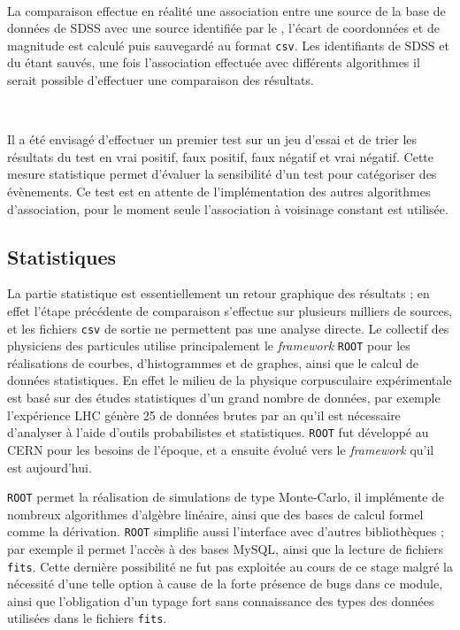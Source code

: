 \

La comparaison effectue en réalité une association entre une source de la base de données de SDSS avec une source identifiée par le \stack{}, l'écart de coordonnées et de magnitude est calculé puis sauvegardé au format \texttt{csv}. Les identifiants de SDSS et du \stack{} étant sauvés, une fois l'association effectuée avec différents algorithmes il serait possible d'effectuer une comparaison des résultats.

\

Il a été envisagé d'effectuer un premier test sur un jeu d'essai et de trier les résultats du test en vrai positif, faux positif, faux négatif et vrai négatif. Cette mesure statistique permet d'évaluer la sensibilité d'un test pour catégoriser des évènements. Ce test est en attente de l'implémentation des autres algorithmes d'association, pour le moment seule l'association à voisinage constant est utilisée.


	\subsection{Statistiques}

La partie statistique est essentiellement un retour graphique des résultats ; en effet l'étape précédente de comparaison s'effectue sur plusieurs milliers de sources, et les fichiers \texttt{csv} de sortie ne permettent pas une analyse directe. Le collectif des physiciens des particules utilise principalement le \emph{framework} \texttt{ROOT} pour les réalisations de courbes, d'histogrammes et de graphes, ainsi que le calcul de données statistiques. En effet le milieu de la physique corpusculaire expérimentale est basé sur des études statistiques d'un grand nombre de données, par exemple l'expérience LHC génère 25 \Po{} de données brutes par an qu'il est nécessaire d'analyser à l'aide d'outils probabilistes et statistiques. \texttt{ROOT} fut développé au CERN pour les besoins de l'époque, et a ensuite évolué vers le \emph{framework} \Cpp{} qu'il est aujourd'hui.

\texttt{ROOT} permet la réalisation de simulations de type Monte-Carlo, il implémente de nombreux algorithmes d'algèbre linéaire, ainsi que des bases de calcul formel comme la dérivation. \texttt{ROOT} simplifie aussi l'interface avec d'autres bibliothèques ; par exemple il permet l'accès à des bases MySQL, ainsi que la lecture de fichiers \texttt{fits}. Cette dernière possibilité ne fut pas exploitée au cours de ce stage malgré la nécessité d'une telle option à cause de la forte présence de bugs dans ce module, ainsi que l'obligation d'un typage fort sans connaissance des types des données utilisées dans le fichiers \texttt{fits}.

